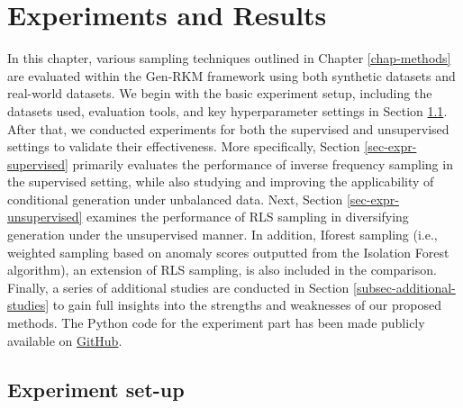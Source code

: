 \chapter{Experiments and Results}
\label{chap-expr}
In this chapter, various sampling techniques outlined in Chapter \ref{chap-methods} are evaluated within the Gen-RKM framework using both synthetic datasets and real-world datasets. We begin with the basic experiment setup, including the datasets used, evaluation tools, and key hyperparameter settings in Section \ref{sec-expr-setup}. After that, we conducted experiments for both the supervised and unsupervised settings to validate their effectiveness. More specifically, Section \ref{sec-expr-supervised} primarily evaluates the performance of inverse frequency sampling in the supervised setting, while also studying and improving the applicability of conditional generation under unbalanced data. Next, Section \ref{sec-expr-unsupervised} examines the performance of RLS sampling in diversifying generation under the unsupervised manner. In addition, Iforest sampling (i.e., weighted sampling based on anomaly scores outputted from the Isolation Forest algorithm), an extension of RLS sampling, is also included in the comparison. Finally, a series of additional studies are conducted in Section \ref{subsec-additional-studies} to gain full insights into the strengths and weaknesses of our proposed methods. The Python code for the experiment part has been made publicly available on \href{https://github.com/wenjierong1999/Unbalanced-RKM}{GitHub}. 

\section{Experiment set-up}
\label{sec-expr-setup}


